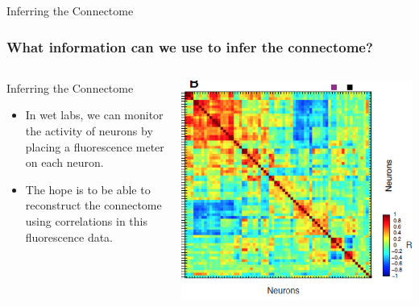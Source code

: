 \documentclass{beamer}
\begin{document}
\begin{frame}{Inferring the Connectome}
\frametitle{What information can we use to infer the connectome?}
  \begin{columns}[T]
    \begin{column}{.5\textwidth}
     \begin{block}{Inferring the Connectome}
\begin{itemize}

\item In wet labs, we can monitor the activity of neurons by placing a fluorescence meter on each neuron. 
\item The hope is to be able to reconstruct the connectome using correlations in this fluorescence data.
\end{itemize}

    \end{block}
    \end{column}
    \begin{column}{.5\textwidth}
    \begin{block}{}
    \includegraphics[width=\textwidth]{correlated_neurons.png}
    \end{block}
    \end{column}
  \end{columns}
\end{frame}
\end{document}
